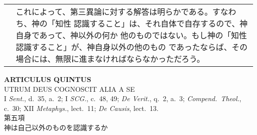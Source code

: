 \documentclass[10pt]{jsarticle} %
\begin{document}
\begin{longtable}{p{21em}p{21em}}
&

これによって、第三異論に対する解答は明らかである。すなわち、神の「知性
認識すること」は、それ自体で自存するので、神自身であって、神以外の何か
他のものではない。もし神の「知性認識すること」が、神自身以外の他のもの
であったならば、その場合には、無限に進まなければならなかっただろう。


\end{longtable}
\newpage



\begin{center}
 {\Large {\bf ARTICULUS QUINTUS}}\\
 {\large UTRUM DEUS COGNOSCIT ALIA A SE}\\
 {\footnotesize I {\itshape Sent.}, d.~35, a.~2; I {\itshape SCG.},
 c.~48, 49; {\itshape De Verit.}, q.~2, a.~3; {\itshape
 Compend.~Theol.}, c.~30; XII {\itshape Metaphys.}, lect.~11; {\itshape
 De Causis}, lect.~13.}\\
 {\Large 第五項\\神は自己以外のものを認識するか}
\end{center}
\end{document}
